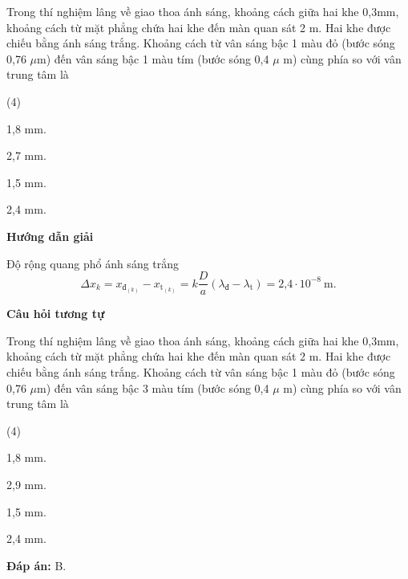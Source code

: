 {
	Trong thí nghiệm lâng về giao thoa ánh sáng, khoảng cách giữa hai khe 0,3mm, khoảng cách từ mặt phẳng chứa hai khe đến màn quan sát 2 m. Hai khe được chiếu bằng ánh sáng trắng. Khoảng cách từ vân sáng bậc 1 màu đỏ (bước sóng 0,76 $\mu$m) đến vân sáng bậc 1 màu tím (bước sóng 0,4 $\mu$ m) cùng phía so với vân trung tâm là
	\begin{mcq}(4)
		\item 1,8 mm.			
		\item 2,7 mm.			
		\item 1,5 mm.			
		\item 2,4 mm.
\end{mcq}}
{\begin{center}
		\textbf{Hướng dẫn giải}
	\end{center}
	
	
	Độ rộng quang phổ ánh sáng trắng
	\begin{equation*}
		\Delta x_{k} = x_{\text{đ}_(k)}-x_{\text{t}_(k)}=k\dfrac{D}{a}(\lambda_\text{đ}-\lambda_\text{t})=\text{2,4} \cdot 10^{-8}\ \text{m}.
	\end{equation*}
	
	\begin{center}
		\textbf{Câu hỏi tương tự}
	\end{center}
	
	Trong thí nghiệm lâng về giao thoa ánh sáng, khoảng cách giữa hai khe 0,3mm, khoảng cách từ mặt phẳng chứa hai khe đến màn quan sát 2 m. Hai khe được chiếu bằng ánh sáng trắng. Khoảng cách từ vân sáng bậc 1 màu đỏ (bước sóng 0,76 $\mu$m) đến vân sáng bậc 3 màu tím (bước sóng 0,4 $\mu$ m) cùng phía so với vân trung tâm là
	\begin{mcq}(4)
		\item 1,8 mm.			
		\item 2,9 mm.			
		\item 1,5 mm.			
		\item 2,4 mm.
	\end{mcq}
	
	\textbf{Đáp án:} B.
}

